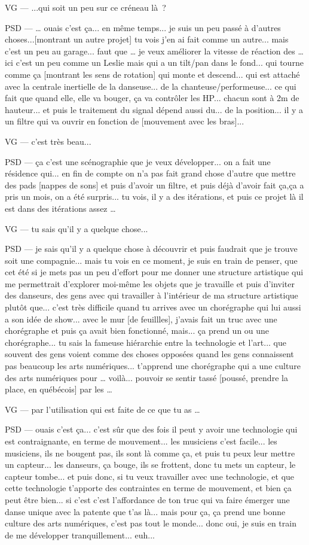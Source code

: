 VG — ...qui soit un peu sur ce créneau là ? 

PSD — … ouais c'est ça... en même temps... je suis un peu passé à d'autres choses...[montrant un autre projet]  tu vois j'en ai fait comme un autre... mais c'est un peu au garage... faut que … je veux améliorer la vitesse de réaction des … ici c'est un peu comme un Leslie  mais qui a un tilt/pan dans le fond... qui tourne comme ça [montrant les sens de rotation] qui monte et descend... qui est attaché avec la centrale inertielle de la danseuse... de la chanteuse/performeuse... ce qui fait que quand elle, elle va bouger, ça va contrôler les HP... chacun sont à 2m de hauteur... et puis le traitement du signal dépend aussi du... de la position... il y a un filtre qui va ouvrir en fonction de [mouvement avec les bras]... 

VG — c'est très beau... 

PSD — ça c'est une scénographie que je veux développer... on a fait une résidence qui... en fin de compte on n'a pas fait grand chose d'autre que mettre des pads [nappes de sons] et puis d'avoir un filtre, et puis déjà d'avoir fait ça,ça a pris un mois, on a été surpris... tu vois, il y a des itérations, et puis ce projet là il est dans des itérations assez … 

VG — tu sais qu'il y a quelque chose... 

PSD — je sais qu'il y a quelque chose à découvrir et puis faudrait que je trouve soit une compagnie... mais tu vois en ce moment, je suis en train de penser, que cet été si je mets pas un peu d'effort pour me donner une structure artistique qui me permettrait d'explorer moi-même les objets que je travaille et puis d'inviter des danseurs, des gens avec qui travailler à l'intérieur de ma structure artistique plutôt que... c'est très difficile quand tu arrives avec un chorégraphe qui lui aussi a son idée de show... avec le mur [de feuillles], j'avais fait un truc avec une chorégraphe et puis ça avait bien fonctionné, mais... ça prend un ou une chorégraphe... tu sais la fameuse hiérarchie entre la technologie et l'art... que souvent des gens voient comme des choses opposées quand les gens connaissent pas beaucoup les arts numériques... t'apprend une chorégraphe qui a une culture des arts numériques pour … voilà... pouvoir se sentir tassé [poussé, prendre la place, en québécois]  par les … 

VG — par l'utilisation qui est faite de ce que tu as … 

PSD — ouais c'est ça... c'est sûr que des fois il peut y avoir une technologie qui est contraignante, en terme de mouvement... les musiciens c'est facile... les musiciens, ils ne bougent pas, ils sont là comme ça, et puis  tu peux leur mettre un capteur... les danseurs, ça bouge, ils se frottent, donc tu mets un capteur, le capteur tombe... et puis donc, si tu veux travailler avec une technologie, et que cette technologie t'apporte des contraintes en terme de mouvement, et bien ça peut être bien... si c'est c'est l'affordance de ton truc qui va faire émerger une danse unique avec la patente que t'as là... mais pour ça, ça prend une bonne culture des arts numériques, c'est pas tout le monde... donc oui, je suis en train de me développer tranquillement... euh... 

